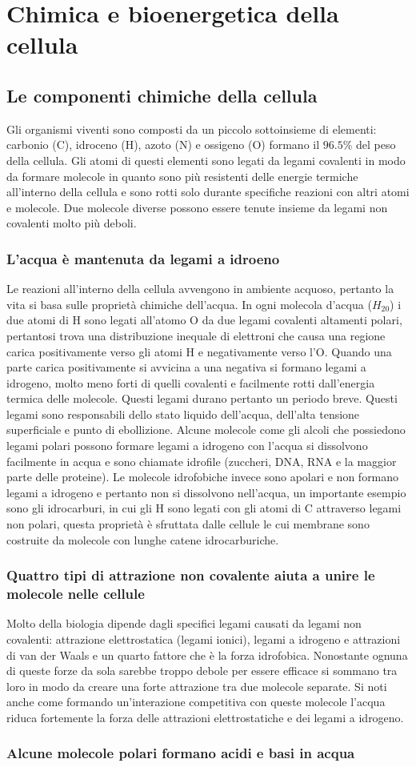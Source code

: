 \chapter{Chimica e bioenergetica della cellula}
\section{Le componenti chimiche della cellula}
Gli organismi viventi sono composti da un piccolo sottoinsieme di elementi: carbonio (C), idroceno (H), azoto (N) e ossigeno (O) formano il $96.5\%$ del peso della cellula. Gli atomi di
questi elementi sono legati da legami covalenti in modo da formare molecole in quanto sono pi\`u resistenti delle energie termiche all'interno della cellula e sono rotti solo durante
specifiche reazioni con altri atomi e molecole. Due molecole diverse possono essere tenute insieme da legami non covalenti molto pi\`u deboli.
\subsection{L'acqua \`e mantenuta da legami a idroeno}
Le reazioni all'interno della cellula avvengono in ambiente acquoso, pertanto la vita si basa sulle propriet\`a chimiche dell'acqua. In ogni molecola d'acqua ($H_20$) i due atomi di 
H sono legati all'atomo O da due legami covalenti altamenti polari, pertantosi trova una distribuzione inequale di elettroni che causa una regione carica positivamente verso gli atomi H
e negativamente verso l'O. Quando una parte carica positivamente si avvicina a una negativa si formano legami a idrogeno, molto meno forti di quelli covalenti e facilmente rotti 
dall'energia termica delle molecole. Questi legami durano pertanto un periodo breve. Questi legami sono responsabili dello stato liquido dell'acqua, dell'alta tensione superficiale e 
punto di ebollizione. Alcune molecole come gli alcoli che possiedono legami polari possono formare legami a idrogeno con l'acqua si dissolvono facilmente in acqua e sono chiamate 
idrofile (zuccheri, DNA, RNA e la maggior parte delle proteine). Le molecole idrofobiche invece sono apolari e non formano legami a idrogeno e pertanto non si dissolvono nell'acqua, un
importante esempio sono gli idrocarburi, in cui gli H sono legati con gli atomi di C attraverso legami non polari, questa propriet\`a \`e sfruttata dalle cellule le cui membrane sono 
costruite da molecole con lunghe catene idrocarburiche.
\subsection{Quattro tipi di attrazione non covalente aiuta a unire le molecole nelle cellule}
Molto della biologia dipende dagli specifici legami causati da legami non covalenti: attrazione elettrostatica (legami ionici), legami a idrogeno e attrazioni di van der Waals e un quarto
fattore che \`e la forza idrofobica. Nonostante ognuna di queste forze da sola sarebbe troppo debole per essere efficace si sommano tra loro in modo da creare una forte attrazione tra due
molecole separate. Si noti anche come formando un'interazione competitiva con queste molecole l'acqua riduca fortemente la forza delle attrazioni elettrostatiche e dei legami a idrogeno.
\subsection{Alcune molecole polari formano acidi e basi in acqua}
